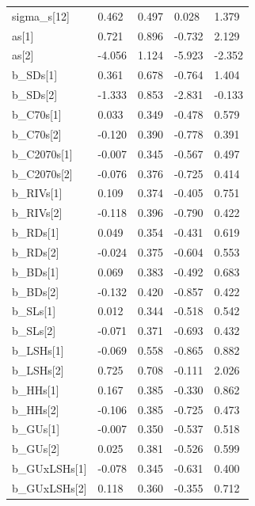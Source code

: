\documentclass[12pt,]{article}
\begin{document}
\begin{table}[]
\begin{tabular}{lllll}
sigma\_s{[}12{]}  & 0.462  & 0.497 & 0.028  & 1.379   \\
as{[}1{]}         & 0.721  & 0.896 & -0.732 & 2.129   \\
as{[}2{]}         & -4.056 & 1.124 & -5.923 & -2.352  \\
b\_SDs{[}1{]}     & 0.361  & 0.678 & -0.764 & 1.404   \\
b\_SDs{[}2{]}     & -1.333 & 0.853 & -2.831 & -0.133  \\
b\_C70s{[}1{]}    & 0.033  & 0.349 & -0.478 & 0.579   \\
b\_C70s{[}2{]}    & -0.120 & 0.390 & -0.778 & 0.391   \\
b\_C2070s{[}1{]}  & -0.007 & 0.345 & -0.567 & 0.497   \\
b\_C2070s{[}2{]}  & -0.076 & 0.376 & -0.725 & 0.414   \\
b\_RIVs{[}1{]}    & 0.109  & 0.374 & -0.405 & 0.751   \\
b\_RIVs{[}2{]}    & -0.118 & 0.396 & -0.790 & 0.422   \\
b\_RDs{[}1{]}     & 0.049  & 0.354 & -0.431 & 0.619   \\
b\_RDs{[}2{]}     & -0.024 & 0.375 & -0.604 & 0.553   \\
b\_BDs{[}1{]}     & 0.069  & 0.383 & -0.492 & 0.683   \\
b\_BDs{[}2{]}     & -0.132 & 0.420 & -0.857 & 0.422   \\
b\_SLs{[}1{]}     & 0.012  & 0.344 & -0.518 & 0.542   \\
b\_SLs{[}2{]}     & -0.071 & 0.371 & -0.693 & 0.432   \\
b\_LSHs{[}1{]}    & -0.069 & 0.558 & -0.865 & 0.882   \\
b\_LSHs{[}2{]}    & 0.725  & 0.708 & -0.111 & 2.026   \\
b\_HHs{[}1{]}     & 0.167  & 0.385 & -0.330 & 0.862   \\
b\_HHs{[}2{]}     & -0.106 & 0.385 & -0.725 & 0.473   \\
b\_GUs{[}1{]}     & -0.007 & 0.350 & -0.537 & 0.518   \\
b\_GUs{[}2{]}     & 0.025  & 0.381 & -0.526 & 0.599   \\
b\_GUxLSHs{[}1{]} & -0.078 & 0.345 & -0.631 & 0.400   \\
b\_GUxLSHs{[}2{]} & 0.118  & 0.360 & -0.355 & 0.712   \\ \hline
\end{tabular}

\label{tab:coefLivestock}
\end{table}

\end{document}
